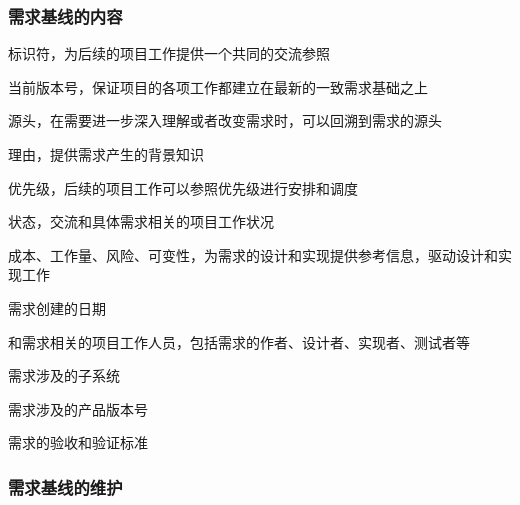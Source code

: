 \subsubsection{需求基线的内容}
\vspace{-0.8em}
\begin{multicols}{2}
    \begin{itemize}
        \item 标识符，为后续的项目工作提供一个共同的交流参照
        \item 当前版本号，保证项目的各项工作都建立在最新的一致需求基础之上
        \item 源头，在需要进一步深入理解或者改变需求时，可以回溯到需求的源头
        \item 理由，提供需求产生的背景知识
        \item 优先级，后续的项目工作可以参照优先级进行安排和调度
        \item 状态，交流和具体需求相关的项目工作状况
        \item 成本、工作量、风险、可变性，为需求的设计和实现提供参考信息，驱动设计和实现工作
        {\fangsong
        \item 需求创建的日期
        \item 和需求相关的项目工作人员，包括需求的作者、设计者、实现者、测试者等
        \item 需求涉及的子系统
        \item 需求涉及的产品版本号
        \item 需求的验收和验证标准}
    \end{itemize}
\end{multicols}
\vspace{-1em}


\subsubsection{需求基线的维护}


